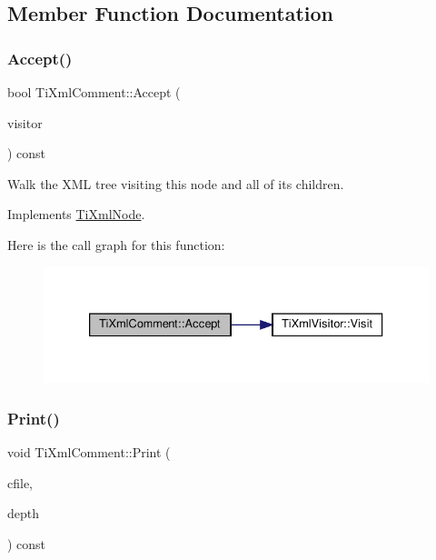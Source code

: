\subsection{Member Function Documentation}
\mbox{\label{classTiXmlComment_ac894241530d1d266131a5026cb251a95}} 
\subsubsection{\texorpdfstring{Accept()}{Accept()}}
{\footnotesize\ttfamily bool Ti\+Xml\+Comment\+::\+Accept (\begin{DoxyParamCaption}\item[{\hyperlink{classTiXmlVisitor}{Ti\+Xml\+Visitor} $\ast$}]{visitor }\end{DoxyParamCaption}) const\hspace{0.3cm}{\ttfamily [virtual]}}

Walk the X\+ML tree visiting this node and all of its children. 

Implements \hyperlink{classTiXmlNode_acc0f88b7462c6cb73809d410a4f5bb86}{Ti\+Xml\+Node}.

Here is the call graph for this function\+:
\nopagebreak
\begin{figure}[H]
\begin{center}
\leavevmode
\includegraphics[width=333pt]{classTiXmlComment_ac894241530d1d266131a5026cb251a95_cgraph}
\end{center}
\end{figure}
\mbox{\label{classTiXmlComment_a873171beac19d40f0eaae945711c98ed}} 
\subsubsection{\texorpdfstring{Print()}{Print()}}
{\footnotesize\ttfamily void Ti\+Xml\+Comment\+::\+Print (\begin{DoxyParamCaption}\item[{F\+I\+LE $\ast$}]{cfile,  }\item[{int}]{depth }\end{DoxyParamCaption}) const\hspace{0.3cm}{\ttfamily [virtual]}}

